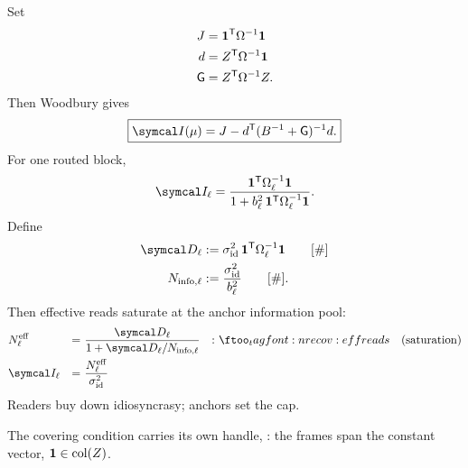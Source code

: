 \documentclass[../main]{subfiles}
\begin{document}
\begin{proposition}
  Set
  \begin{align}
    J &= \mathbf 1\sp{\mathsf{T}}\Omega\sp{-1}\mathbf 1
      \label{eq:recov:woodJ}\\
    d &= Z\sp{\mathsf{T}}\Omega\sp{-1}\mathbf 1
      \label{eq:recov:woodd}\\
    \mathsf{G} &= Z\sp{\mathsf{T}}\Omega\sp{-1}Z.
      \label{eq:recov:woodG}
  \end{align}
  Then Woodbury gives
  \begin{equation}
    \boxed{
      \precisionof{\recoveryfact}
      =\woodburyJ-\woodburyd\transpose
      (\anchorprior\sp{-1}+\framegram)\sp{-1}\woodburyd.
    }
    \label{eq:recov:sat}
  \end{equation}
  For one routed block,
  \begin{equation}
    \precision\sb{\ell}
    =\frac{\mathbf 1\transpose\idcov\sb{\ell}\sp{-1}\mathbf 1}
      {1+\anchorvariance\,\mathbf 1\transpose\idcov\sb{\ell}\sp{-1}\mathbf 1}.
    \label{eq:recov:block}
  \end{equation}
  Define
  \begin{align}
    \cleanreads[\ell]
      &:=\idvariance\,\mathbf 1\transpose\idcov\sb{\ell}\sp{-1}\mathbf 1
      \qquad \dimcount
      \label{eq:recov:cleanreads}\\
    \infopool[\ell]
      &:=\frac{\idvariance}{\anchorvariance}
      \qquad \dimcount.
      \label{eq:recov:infopool}
  \end{align}
  Then effective reads saturate at the anchor information pool:
  \begin{align}
    &\effectivereads[\ell] &=& \ \frac{\cleanreads[\ell]}{1+\cleanreads[\ell]/\infopool[\ell]}
      &:& \eqtag{recov:effreads}{saturation}\\
    &\precision\sb{\ell} &=& \ \frac{\effectivereads[\ell]}{\idvariance}
      \label{eq:recov:effprecision}
  \end{align}
  Readers buy down idiosyncrasy; anchors set the cap.
\end{proposition}

The covering condition carries its own handle, : the frames span the
constant vector, $\mathbf 1\in\operatorname{col}(Z)$.
\end{document}
